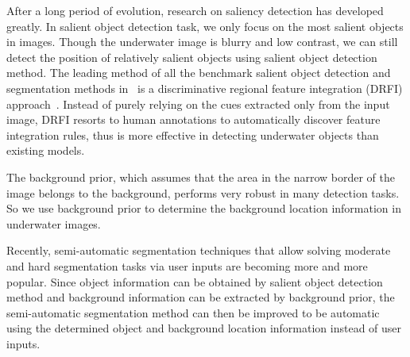 \documentclass[conference]{IEEEtran}
\begin{document}
After a long period of evolution, research on saliency detection has developed greatly. In salient object detection task, we only focus on the most salient objects in images. Though the underwater image is blurry and low contrast, we can still detect the position of relatively salient objects using salient object detection method. The leading method of all the benchmark salient object detection and segmentation methods in~\cite{borji2015salient} is a discriminative regional feature integration (DRFI) approach~\cite{jiang2013salient}. Instead of purely relying on the cues extracted only from the input image, DRFI resorts to human annotations to automatically discover feature integration rules, thus is more effective in detecting underwater objects than existing models.

The background prior, which assumes that the area in the narrow border of the image belongs to the background, performs very robust in many detection tasks. So we use background prior to determine the background location information in underwater images. 

Recently, semi-automatic segmentation techniques that allow solving moderate and hard segmentation tasks via user inputs are becoming more and more popular. Since object information can be obtained by salient object detection method and background information can be extracted by background prior, the semi-automatic segmentation method can then be improved to be automatic using the determined object and background location information instead of user inputs.


\end{document}
